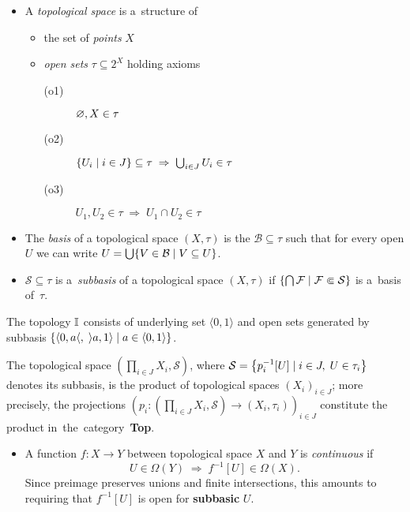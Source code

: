 \begin{itemize}
\item A \emph{topological space} is a~structure of
  \begin{itemize}
  \item the set of \emph{points\/} $X$
  \item \emph{open sets\/} $\tau\subseteq 2^X$ holding axioms
    \begin{description}
    \item[(o1)] $\varnothing, X \in \tau$
    \item[(o2)] $\left\{ U_i \mid i\in J \right\} \subseteq \tau \; \Rightarrow
    \; \bigcup_{i\in J} U_i \in \tau$
    \item[(o3)] $U_1, U_2 \in \tau \; \Rightarrow \; U_1 \cap U_2 \in \tau$
    \end{description}
  \end{itemize}

\item The \emph{basis} of a topological space $(X, \tau)$ is the
$\mathcal{B}\subseteq \tau$ such that for every open $U$ we can write $U =
\bigcup \{V\in \mathcal{B} \mid V\subseteq U \}$.

\item $\mathcal{S}\subseteq \tau$ is a~\emph{subbasis} of a
topological space $(X, \tau)$ if $\left\{ \bigcap \mathcal{F} \mid \mathcal{F}
\Subset \mathcal{S} \right\}$ is a~basis of~$\tau$.
\end{itemize}

\begin{exmpl}
  The topology $\mathbb{I}$ consists of underlying set $\langle 0, 1 \rangle$ and open
  sets generated by subbasis $\{ \langle 0, a \langle, \; \rangle a, 1 \rangle
  \mid a\in \langle 0, 1 \rangle \}$.
\end{exmpl}

\begin{fact}
  The topological space $\left( \prod_{i\in J} X_i, \mathcal{S} \right)$, where
  $\mathcal{S} = \left\{ p_{i}^{-1}[U] \mid i\in J, \; U\in \tau_i \right\}$
  denotes its subbasis, is the product of topological spaces $\left( X_i
  \right)_{i\in J}$;
  more precisely, the projections $\left( p_i\colon \left(\prod_{i\in J} X_i,
  \mathcal{S}\right) \to \left(X_i, \tau_i\right) \right)_{i\in J}$
  constitute the product in~the~category~{\bf Top}.
\end{fact}

\begin{itemize}
\item A function $f\colon X \to Y$ between topological space $X$ and $Y$ is
\emph{continuous} if 
\[
  U\in \Omega(Y) \; \Longrightarrow \; f^{-1}[U]\in \Omega(X).
\]
Since preimage preserves unions and finite intersections, this amounts to
requiring that $f^{-1}[U]$ is open for {\bf subbasic} $U$.
\end{itemize}

